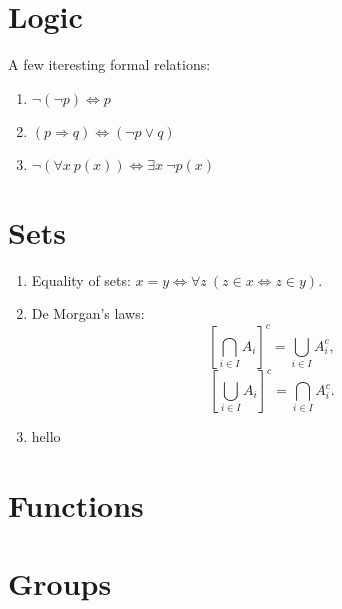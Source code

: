 \documentclass[12pt, a4paper]{article}
\begin{document}
\section{Logic}
A few iteresting formal relations:
\begin{enumerate}
    \item $\neg (\neg p) \Leftrightarrow p$
    \item $(p \Rightarrow q) \Leftrightarrow (\neg p \vee q)$
    \item $\neg (\forall x \ p(x)) \Leftrightarrow \exists x \ \neg p(x) $
\end{enumerate}

\section{Sets}
\begin{enumerate}
    \item Equality of sets: $x = y \Leftrightarrow \forall z \ (z \in x \Leftrightarrow z \in y)$.
    \item De Morgan's laws:
        \[ \left[ \bigcap _{i\in I}A_{i} \right] ^{c} = \bigcup _{i\in I}{A_{i}^{c}}, \]
        \[ \left[ \bigcup _{i\in I}A_{i} \right] ^{c} = \bigcap _{i\in I}{A_{i}^{c}}. \]
    \item hello
\end{enumerate}

\section{Functions}

\section{Groups}
\end{document}
